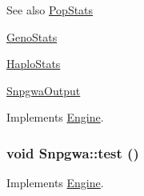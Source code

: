 \begin{DoxySeeAlso}{See also}
\hyperlink{classPopStats}{PopStats} 

\hyperlink{classGenoStats}{GenoStats} 

\hyperlink{classHaploStats}{HaploStats} 

\hyperlink{classSnpgwaOutput}{SnpgwaOutput} 
\end{DoxySeeAlso}


Implements \hyperlink{classEngine_a005f8e277c3dea16ea05803fba223db7}{Engine}.

\hypertarget{classSnpgwa_af5ea7279e2d31bc5f05a1fc6cd4ef17e}{
\subsubsection[{test}]{\setlength{\rightskip}{0pt plus 5cm}void Snpgwa::test ()}}
\label{classSnpgwa_af5ea7279e2d31bc5f05a1fc6cd4ef17e}


Implements \hyperlink{classEngine_a2927c4a4263809453063ad482c6434a4}{Engine}.



